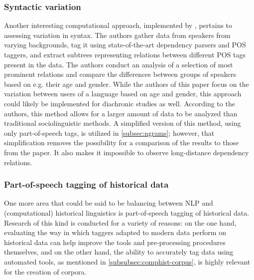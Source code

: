 \subsubsection{Syntactic variation}
\label{subsubsec:syntactic-var}

Another interesting computational approach, implemented by \citet{johannsen-etal-2015-cross}, pertains to assessing variation in syntax. The authors gather data from speakers from varying backgrounds, tag it using state-of-the-art dependency parsers and POS taggers, and extract subtrees representing relations between different POS tags present in the data. The authors conduct an analysis of a selection of most prominent relations and compare the differences between groups of speakers based on e.g. their age and gender. While the authors of this paper focus on the variation between users of a language based on age and gender, this approach could likely be implemented for diachronic studies as well. According to the authors, this method allows for a larger amount of data to be analyzed than traditional sociolinguistic methods. A simplified version of this method, using only part-of-speech tags, is utilized in \autoref{subsec:ngrams}; however, that simplification removes the possibility for a comparison of the results to those from the paper. It also makes it impossible to observe long-distance dependency relations.

\subsubsection{Part-of-speech tagging of historical data}
\label{subsubsec:historical-pos-tagging}

One more area that could be said to be balancing between NLP and (computational) historical linguistics is part-of-speech tagging of historical data. Research of this kind is conducted for a variety of reasons: on the one hand, evaluating the way in which taggers adapted to modern data perform on historical data can help improve the tools and pre-processing procedures themselves, and on the other hand, the ability to accurately tag data using automated tools, as mentioned in \autoref{subsubsec:comphist-corpus}, is highly relevant for the creation of corpora. 


